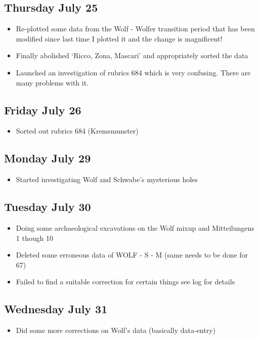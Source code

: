 \documentclass[12pt]{article}
\begin{document}
\subsection{Thursday July 25}
\begin{itemize}
    \item Re-plotted some data from the Wolf - Wolfer transition period that has been modified since last time I plotted it and the change is magnificent! 
    \item Finally abolished `Ricco, Zona, Mascari' and appropriately sorted the data
    \item Launched an investigation of rubrics 684 which is very confusing. There are many problems with it.
\end{itemize}

\subsection{Friday July 26}
\begin{itemize}
    \item Sorted out rubrics 684 (Kremsmunster)
\end{itemize}

\subsection{Monday July 29}
\begin{itemize}
    \item Started investigating Wolf and Schwabe's mysterious holes
\end{itemize}

\subsection{Tuesday July 30}
\begin{itemize}
    \item Doing some archaeological excavations on the Wolf mixup and Mitteilungens 1 though 10 
    \item Deleted some erroneous data of WOLF - S - M (same needs to be done for 67)
    \item Failed to find a suitable correction for certain things see log for details
\end{itemize}

\subsection{Wednesday July 31}
\begin{itemize}
    \item Did some more corrections on Wolf's data (basically data-entry)
\end{itemize}
\end{document}
